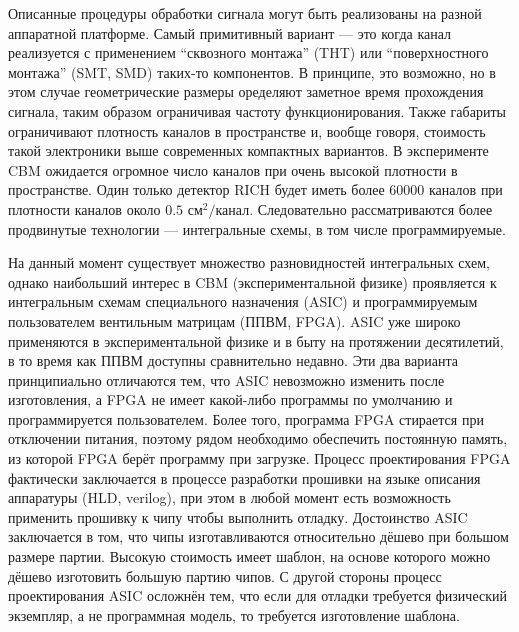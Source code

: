 Описанные процедуры обработки сигнала могут быть реализованы на разной аппаратной платформе. Самый примитивный вариант --- это когда канал реализуется с применением ``сквозного монтажа'' (THT) или ``поверхностного монтажа'' (SMT, SMD) \todo таких-то компонентов. В принципе, это возможно, но в этом случае геометрические размеры оределяют заметное время прохождения сигнала, таким образом ограничивая частоту функционирования. Также габариты ограничивают плотность каналов в пространстве и, вообще говоря, стоимость такой электроники выше современных компактных вариантов. В эксперименте CBM ожидается огромное число каналов при очень высокой плотности в пространстве. Один только детектор RICH будет иметь более 60000 каналов при плотности каналов около $0.5$ см$^{2}/$канал. Следовательно рассматриваются более продвинутые технологии --- интегральные схемы, в том числе программируемые.

На данный момент существует множество разновидностей интегральных схем, однако наибольший интерес в CBM (экспериментальной физике\todo) проявляется к интегральным схемам специального назначения (ASIC) и программируемым пользователем вентильным матрицам (ППВМ, FPGA). ASIC уже широко применяются в экспериментальной физике и в быту на протяжении десятилетий, в то время как ППВМ доступны сравнительно недавно. Эти два варианта принципиально отличаются тем, что ASIC невозможно изменить после изготовления, а FPGA не имеет какой-либо программы по умолчанию и программируется пользователем. Более того, программа FPGA стирается при отключении питания, поэтому рядом необходимо обеспечить постоянную память, из которой FPGA берёт программу при загрузке. Процесс проектирования FPGA фактически заключается в процессе разработки прошивки на языке описания аппаратуры (HLD, verilog), при этом в любой момент есть возможность применить прошивку к чипу чтобы выполнить отладку. Достоинство ASIC заключается в том, что чипы изготавливаются относительно дёшево при большом размере партии. Высокую стоимость имеет шаблон, на основе которого можно дёшево изготовить большую партию чипов. С другой стороны процесс проектирования ASIC осложнён тем, что если для отладки требуется физический экземпляр, а не программная модель, то требуется изготовление шаблона.

